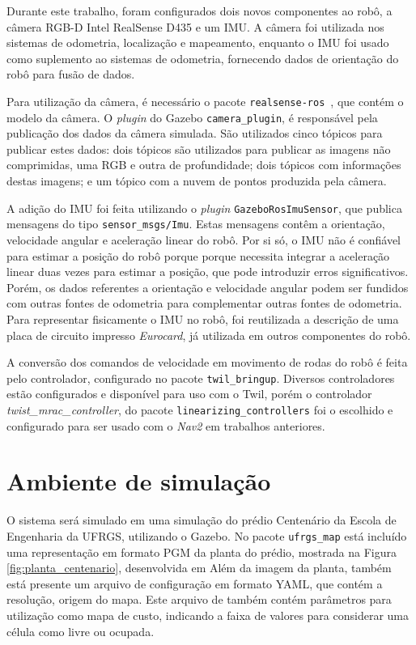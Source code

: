 \documentclass[repeatfields,xlists,xpacks,oneside,yearsonly]{ufrgscca}
\begin{document}
Durante este trabalho, foram configurados dois novos componentes ao
robô, a câmera RGB-D Intel RealSense D435 e um IMU. A câmera foi
utilizada nos sistemas de odometria, localização e mapeamento,
enquanto o IMU foi usado como suplemento ao sistemas de odometria,
fornecendo dados de orientação do robô para fusão de dados.

Para utilização da câmera, é necessário o pacote
\texttt{realsense-ros}~\cite{realsense_ros}, que contém o modelo da
câmera. O \textit{plugin} do Gazebo \texttt{camera\_plugin}, é
responsável pela publicação dos dados da câmera simulada. São
utilizados cinco tópicos para publicar estes dados: dois tópicos são
utilizados para publicar as imagens não comprimidas, uma RGB e outra
de profundidade; dois tópicos com informações destas imagens; e um
tópico com a nuvem de pontos produzida pela câmera.

A adição do IMU foi feita utilizando o \textit{plugin}
\texttt{GazeboRosImuSensor}, que publica mensagens do tipo
\texttt{sensor\_msgs/Imu}. Estas mensagens contêm a orientação,
velocidade angular e aceleração linear do robô. Por si só, o IMU não
é confiável para estimar a posição do robô porque porque necessita
integrar a aceleração linear duas vezes para estimar a posição, que
pode introduzir erros significativos. Porém, os dados referentes a
orientação e velocidade angular podem ser fundidos com outras fontes
de odometria para complementar outras fontes de odometria. Para
representar fisicamente o IMU no robô, foi reutilizada a descrição de
uma placa de circuito impresso \textit{Eurocard}, já utilizada em
outros componentes do robô.

A conversão dos comandos de velocidade em movimento de rodas do robô
é feita pelo controlador, configurado no pacote
\texttt{twil\_bringup}. Diversos controladores estão configurados e
disponível para uso com o Twil, porém o controlador
\textit{twist\_mrac\_controller}, do pacote
\texttt{linearizing\_controllers} foi o escolhido e configurado para
ser usado com o \textit{Nav2} em trabalhos anteriores.

\section{Ambiente de simulação}

O sistema será simulado em uma simulação do prédio Centenário da
Escola de Engenharia da UFRGS, utilizando o Gazebo. No pacote
\texttt{ufrgs\_map} está incluído uma representação em formato PGM da
planta do prédio, mostrada na Figura \ref{fig:planta_centenario},
desenvolvida em \textcite{petry_tcc} Além da imagem da planta, também
está presente um arquivo de configuração em formato YAML, que contém
a resolução, origem do mapa. Este arquivo de também contém parâmetros
para utilização como mapa de custo, indicando a faixa de valores para
considerar uma célula como livre ou ocupada.
\end{document}
